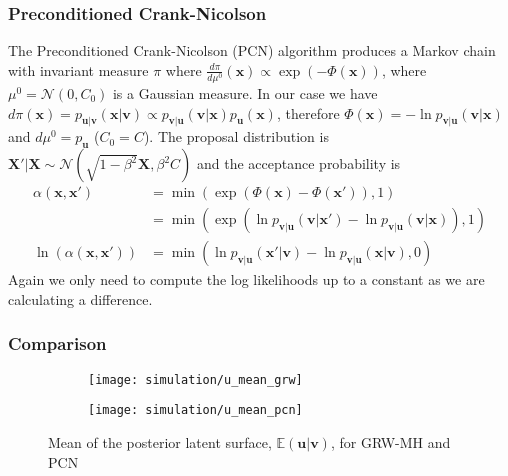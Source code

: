 \documentclass[11pt]{article}
\begin{document}
\subsubsection{Preconditioned Crank-Nicolson}
The Preconditioned Crank-Nicolson (PCN) algorithm produces a Markov chain with invariant measure $\pi$ where $\frac{d\pi}{d\mu^0}(\boldsymbol{x}) \propto \exp(-\Phi(\boldsymbol{x}))$, where $\mu^0 = \mathcal{N}(0, C_0)$ is a Gaussian measure. In our case we have $d\pi(\boldsymbol{x}) = p_{\boldsymbol{u} | \boldsymbol{v}}(\boldsymbol{x} | \boldsymbol{v}) \propto p_{\boldsymbol{v} | \boldsymbol{u}}(\boldsymbol{v} | \boldsymbol{x}) p_{\boldsymbol{u}}(\boldsymbol{x})$, therefore $\Phi(\boldsymbol{x}) = -\ln p_{\boldsymbol{v} | \boldsymbol{u}}(\boldsymbol{v} | \boldsymbol{x})$ and $d\mu^0 = p_{\boldsymbol{u}}$ ($C_0 = C$). The proposal distribution is $\boldsymbol{X}' | \boldsymbol{X} \sim \mathcal{N}(\sqrt{1-\beta^2}\boldsymbol{X}, \beta^2 C)$ and the acceptance probability is
\begin{equation}
    \begin{aligned}
        \alpha(\boldsymbol{x}, \boldsymbol{x}') &= \min\left(\exp(\Phi(\boldsymbol{x}) - \Phi(\boldsymbol{x}')), 1\right) \\
          &= \min\left(\exp(\ln p_{\boldsymbol{v} | \boldsymbol{u}}(\boldsymbol{v} | \boldsymbol{x}') - \ln p_{\boldsymbol{v} | \boldsymbol{u}}(\boldsymbol{v} | \boldsymbol{x})), 1\right) \\
        \ln (\alpha(\boldsymbol{x}, \boldsymbol{x}')) &= \min(\ln p_{\boldsymbol{v} | \boldsymbol{u}}(\boldsymbol{x}' | \boldsymbol{v}) - \ln p_{\boldsymbol{v} | \boldsymbol{u}}(\boldsymbol{x} | \boldsymbol{v}), 0)
    \end{aligned}
\end{equation}
Again we only need to compute the log likelihoods up to a constant as we are calculating a difference.

\subsubsection{Comparison}
\begin{figure}
    \centering
    \begin{subfigure}{0.45\textwidth}
        \texttt{[image: simulation/u\_mean\_grw]}
    \end{subfigure}
    \begin{subfigure}{0.45\textwidth}
        \texttt{[image: simulation/u\_mean\_pcn]}
    \end{subfigure}
    \caption{Mean of the posterior latent surface, $\mathbb{E}(\boldsymbol{u} | \boldsymbol{v})$, for GRW-MH and PCN}
    \label{fig:u_mean}
\end{figure}
\end{document}
